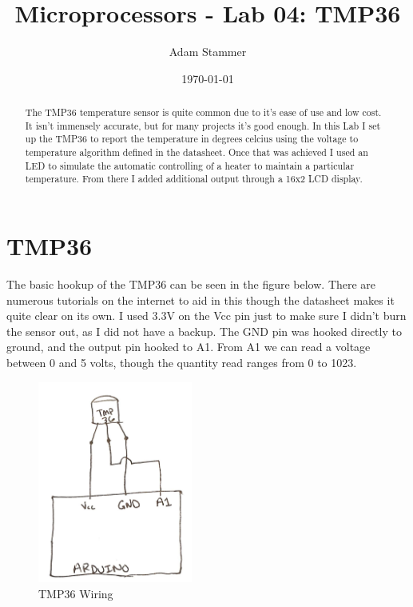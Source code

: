 \documentclass[prb,preprint]{revtex4-1}
\begin{document}
\title{Microprocessors - Lab 04: TMP36}
\author{Adam Stammer}

\date{\today}

\begin{abstract}
The TMP36 temperature sensor is quite common due to it's ease of use and low cost. It isn't immensely accurate, but for many projects it's good enough. In this Lab I set up the TMP36 to report the temperature in degrees celcius using the voltage to temperature algorithm defined in the datasheet. Once that was achieved I used an LED to simulate the automatic controlling of a heater to maintain a particular temperature. From there I added additional output through a 16x2 LCD display.
\end{abstract}

\maketitle




\section{TMP36}
The basic hookup of the TMP36 can be seen in the figure below. There are numerous tutorials on the internet to aid in this though the datasheet makes it quite clear on its own. I used 3.3V on the Vcc pin just to make sure I didn't burn the sensor out, as I did not have a backup. The GND pin was hooked directly to ground, and the output pin hooked to A1. From A1 we can read a voltage between 0 and 5 volts, though the quantity read ranges from 0 to 1023.

\begin{figure}[H]
	\centering
	\includegraphics[width=2in]{schem.jpg}
	\caption{TMP36 Wiring}
	\label{fig1}
\end{figure}
\end{document}
